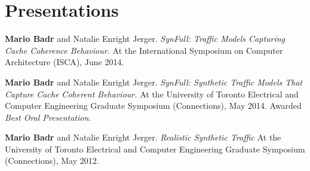 \section{\sc Presentations}

\onerow
{
  \textbf{Mario Badr} and Natalie Enright Jerger.
  \textit{SynFull: Traffic Models Capturing Cache Coherence Behaviour.}
  At the International Symposium on Computer Architecture (ISCA), June 2014.
}

\onerow
{
  \textbf{Mario Badr} and Natalie Enright Jerger.
  \textit{SynFull: Synthetic Traffic Models That Capture Cache Coherent Behaviour.}
  At the University of Toronto Electrical and Computer Engineering Graduate Symposium (Connections), May 2014.
  Awarded \textit{Best Oral Presentation}.
}

\onerow
{
  \textbf{Mario Badr} and Natalie Enright Jerger.
  \textit{Realistic Synthetic Traffic}
  At the University of Toronto Electrical and Computer Engineering Graduate Symposium (Connections), May 2012.
}
